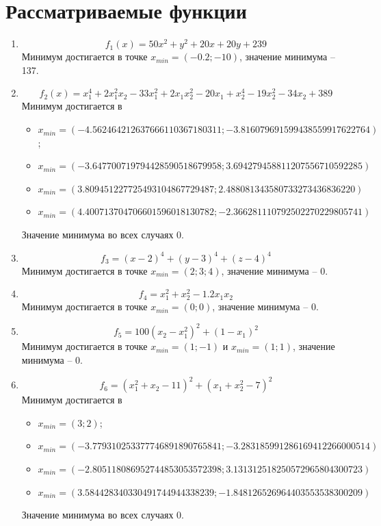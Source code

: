 \documentclass[12pt]{article}
\begin{document}
\newpage
\section{Рассматриваемые функции}

\begin{enumerate}
 	\item \[f_1(x) = 50x^2+y^2+20x+20y+239\]
 	Минимум достигается в точке $x_{min} = (-0.2; -10)$, значение минимума -- 137.

 	\item \[ f_2(x) = x_1^4+2x_1^2 x_2-33x_1^2+2x_1 x_2^2-20x_1+x_2^4-19x_2^2-34x_2+389 \]
 	Минимум достигается в
 	\begin{itemize}
 		\item $x_{min} = (-4.562464212637666110367180311; -3.816079691599438559917622764)$;
 		\item $x_{min} = (-3.647700719794428590518679958; 3.694279458811207556710592285)$
 		\item $x_{min} = (3.809451227725493104867729487; 2.488081343580733273436836220)$
 		\item $x_{min} = (4.400713704706601596018130782; -2.366281110792502270229805741)$
 	\end{itemize}
 	Значение минимума во всех случаях 0.

 	\item \[ f_3 = (x-2)^4+(y-3)^4+(z-4)^4\]
 	Минимум достигается в точке $x_{min} = (2; 3; 4)$, значение минимума -- 0.

 	\item \[ f_4 = x_1^2+x_2^2-1.2x_1x_2\]
 	Минимум достигается в точке $x_{min} = (0; 0)$, значение минимума -- 0.

 	\item \[ f_5 = 100 (x_2-x_1^2)^2+(1-x_1)^2\]
 	Минимум достигается в точке $x_{min} = (1; -1)$ и $x_{min} = (1; 1)$, значение минимума -- 0.

 	\item \[ f_6 = (x_1^2+x_2-11)^2+(x_1+x_2^2-7)^2 \]
 	Минимум достигается в
 	\begin{itemize}
 		\item $x_{min} = (3; 2)$;
 		\item $x_{min} = (-3.779310253377746891890765841; -3.283185991286169412266000514)$
 		\item $x_{min} = (-2.805118086952744853053572398; 3.131312518250572965804300723)$
 		\item $x_{min} = (3.584428340330491744944338239; -1.848126526964403553538300209)$
 	\end{itemize}
 	Значение минимума во всех случаях 0.


\end{enumerate}
\end{document}

